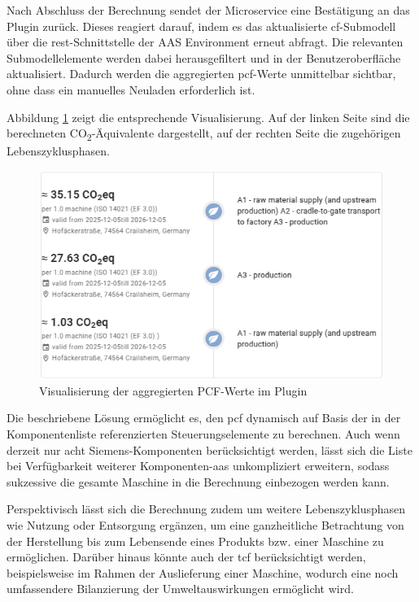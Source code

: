 Nach Abschluss der Berechnung sendet der Microservice eine Bestätigung an das Plugin zurück. 
Dieses reagiert darauf, indem es das aktualisierte \acs{cf}-Submodell über die \acs{rest}-Schnittstelle der AAS Environment erneut abfragt. 
Die relevanten Submodellelemente werden dabei herausgefiltert und in der Benutzeroberfläche aktualisiert. 
Dadurch werden die aggregierten \acs{pcf}-Werte unmittelbar sichtbar, ohne dass ein manuelles Neuladen erforderlich ist.

Abbildung \ref{fig:PluginAggregation} zeigt die entsprechende Visualisierung. 
Auf der linken Seite sind die berechneten CO\textsubscript{2}-Äquivalente dargestellt, auf der rechten Seite die zugehörigen Lebenszyklusphasen.

\begin{figure}[htbp]
    \centering
        \includegraphics{Bilder/Ergebnisse/DPP/PluginAggregation.png}
    \caption{Visualisierung der aggregierten PCF-Werte im Plugin}
    \label{fig:PluginAggregation}
\end{figure}

Die beschriebene Lösung ermöglicht es, den \acs{pcf} dynamisch auf Basis der in der Komponentenliste referenzierten Steuerungselemente zu berechnen. 
Auch wenn derzeit nur acht Siemens-Komponenten berücksichtigt werden, lässt sich die Liste bei Verfügbarkeit weiterer Komponenten-\acs{aas} unkompliziert erweitern, sodass sukzessive die gesamte Maschine in die Berechnung einbezogen werden kann.

Perspektivisch lässt sich die Berechnung zudem um weitere Lebenszyklusphasen wie Nutzung oder Entsorgung ergänzen, um eine ganzheitliche Betrachtung von der Herstellung bis zum Lebensende eines Produkts bzw. einer Maschine zu ermöglichen.
Darüber hinaus könnte auch der \acs{tcf} berücksichtigt werden, beispielsweise im Rahmen der Auslieferung einer Maschine, wodurch eine noch umfassendere Bilanzierung der Umweltauswirkungen ermöglicht wird.

